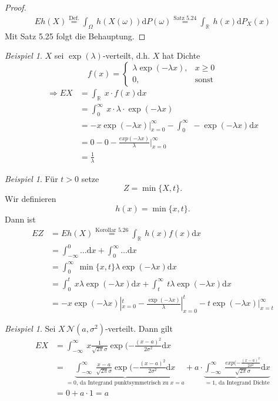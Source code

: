 \documentclass[a4paper,12pt,fleqn]{scrartcl}
\newcommand{\R}{\mathbb{R}}
\newcommand{\m}[1]{\mathcal{ #1 }}
\newcommand{\impl}{\Rightarrow}
\theoremstyle{definition}
\theoremstyle{plain}
\theoremstyle{remark}
\newtheorem{beispiel}[definition]{Beispiel}
\newtheorem*{beispiel*}{Beispiel}
\begin{document}
\begin{proof}
\begin{align*}
Eh(X) \overset{\text{Def.}}{=} \int_{\Omega}\: h(X(\omega))\mathrm{d}P(\omega) \overset{\text{Satz 5.24}}{=} \int_{\R}\: h(x)\mathrm{d}P_X(x)
\end{align*}
Mit Satz 5.25 folgt die Behauptung.
\end{proof}
\begin{beispiel}
$X$ sei $\exp(\lambda)$-verteilt, d.h. $X$ hat Dichte
\[f(x)=\begin{cases}\lambda\exp(-\lambda x),&x\geq 0\\
0,&\text{sonst}
\end{cases}\]
\begin{align*}
\impl EX&=\int_{\R}\: x\cdot f(x)\mathrm{d}x\\
&=\int_0^{\infty}\: x\cdot\lambda\cdot\exp(-\lambda x)\\
&=-x\exp(-\lambda x)|_{x=0}^{\infty}-\int_0^{\infty}\:-\exp(-\lambda x)\mathrm{d}x\\
&=0-0-\frac{exp(-\lambda x)}{\lambda}|_{x=0}^{\infty}\\
&=\frac{1}{\lambda}
\end{align*}
\end{beispiel}
\begin{beispiel*}
Für $t>0$ setze
\[Z=\min\{ X,t\}.\]
Wir definieren
\[h(x)=\min\{ x,t\}.\]
Dann ist
\begin{align*}
EZ&=Eh(X)\overset{\text{Korollar 5.26}}{=}\int_{\R}\: h(x)f(x)\mathrm{d}x\\
&=\int_{-\infty}^0\ldots\mathrm{d}x+\int_0^{\infty}\ldots\mathrm{d}x\\
&=\int_0^{\infty}\:\min\{ x,t\}\lambda\exp(-\lambda x)\mathrm{d} x\\
&=\int_0^t\: x\lambda\exp(-\lambda x)\mathrm{d}x+\int_t^{\infty}\: t\lambda\exp(-\lambda x)\mathrm{d}x\\
&=-x\exp(-\lambda x)|_{x=0}^t-\frac{\exp(-\lambda x)}{\lambda}|_{x=0}^t-t\exp(-\lambda x)|_{x=t}^{\infty}
\end{align*}
\end{beispiel*}
\begin{beispiel}
Sei $X \, \m{N}(a,\sigma^2)$-verteilt. Dann gilt
\begin{align*}
EX&=\int_{-\infty}^{\infty}\: x\frac{1}{\sqrt{2\pi}\sigma}\exp(-\frac{(x-a)^2}{2\sigma^2}\mathrm{d}x\\
&=\underbrace{\int_{-\infty}^{\infty}\: \frac{x-a}{\sqrt{2\pi}\sigma}\exp(-\frac{(x-a)^2}{2\sigma^2}\mathrm{d}x}_{=0\text{, da Integrand punktsymmetrisch zu }x=a}+a\cdot\underbrace{\int_{-\infty}^{\infty}\: \frac{exp(-\frac{(x-a)^2}{2\sigma^2}}{\sqrt{2\pi}\sigma}\mathrm{d}x}_{=1\text{, da Integrand Dichte}}\\
&=0+a\cdot 1=a
\end{align*}
\end{beispiel}
\end{document}
